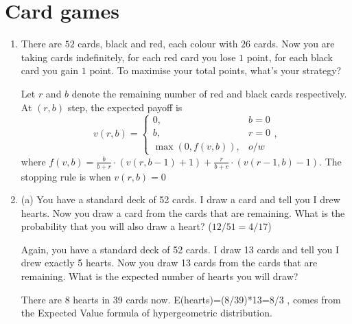 \documentclass{article}
\begin{document}
\section{Card games}
\begin{enumerate}
    \item There are $52$ cards, black and red, each colour with $26$ cards. Now you are taking cards indefinitely, for each red card you lose $1$ point, for each black card you gain $1$ point. To maximise your total points, what's your strategy?
    
        Let $r$ and $b$ denote the remaining number of red and black cards respectively. At $(r,b)$ step, the expected payoff is 
    $$v(r,b) = \begin{cases}
        0, & b=0 \\
        b, & r=0 \\
        \max(0, f(v,b)),& o/w
    \end{cases},$$
    where $f(v,b) = \frac{b}{b+r}\cdot (v(r,b-1)+1) + \frac{r}{b+r}\cdot (v(r-1,b)-1)$. The stopping rule is when $v(r,b) = 0$


    \item (a) You have a standard deck of 52 cards. I draw a card and tell you I drew hearts. Now you draw a card from the cards that are remaining. What is the probability that you will also draw a heart? ($12/51 = 4/17$)
    
    Again, you have a standard deck of 52 cards. I draw 13 cards and tell you I drew exactly 5 hearts. Now you draw 13 cards from the cards that are remaining. What is the expected number of hearts you will draw?

     There are 8 hearts in 39 cards now. E(hearts)=(8/39)*13=8/3 , comes from the Expected Value formula of hypergeometric distribution. 
\end{enumerate}
\end{document}
